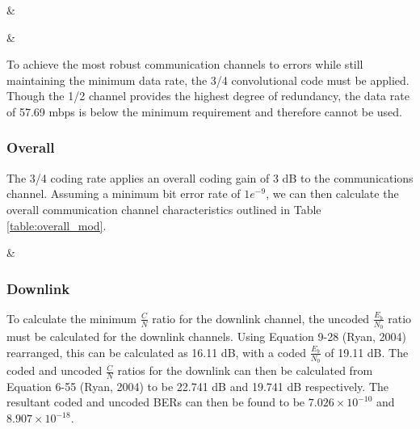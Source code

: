 \documentclass[12pt]{article}
\begin{document}
{\Name & \Value }

{\Name & \Value }

To achieve the most robust communication channels to errors while still maintaining the minimum data rate, the 3/4 convolutional code must be applied. Though the 1/2 channel provides the highest degree of redundancy, the data rate of 57.69 mbps is below the minimum requirement and therefore cannot be used. 

\subsubsection{Overall}
The 3/4 coding rate applies an overall coding gain of 3 dB to the communications channel. Assuming a minimum bit error rate of \(1e^{-9}\), we can then calculate the overall communication channel characteristics outlined in Table \ref{table:overall_mod}. 

{\Name & \Value }

\subsubsection{Downlink}
To calculate the minimum \(\frac{C}{N}\) ratio for the downlink channel, the uncoded \(\frac{E_b}{N_0}\) ratio must be calculated for the downlink channels. Using Equation 9-28 (Ryan, 2004) rearranged, this can be calculated as 16.11 dB, with a coded \(\frac{E_b}{N_0}\) of 19.11 dB. The coded and uncoded \(\frac{C}{N}\) ratios for the downlink can then be calculated from Equation 6-55 (Ryan, 2004) to be 22.741 dB and 19.741 dB respectively. The resultant coded and uncoded BERs can then be found to be \(7.026 \times 10^{-10}\) and \(8.907 \times 10^{-18}\). 
\end{document}
